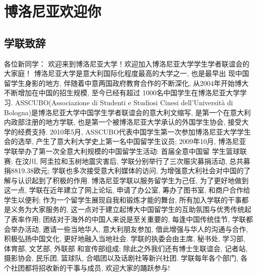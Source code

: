 
% 


\chapter{博洛尼亚欢迎你}                 %

\section{学联致辞}

各位新同学：
             欢迎来到博洛尼亚大学！欢迎加入博洛尼亚大学学生学者联谊会的大家庭！
          博洛尼亚大学是意大利国际化程度最高的大学之一, 也是最早出 现中国留学生身影的地方, 伴随着中意两国政府教育合作的不断深化, 从2004年开始博大不断增加在中国的招生规模, 至今已经有超过 1000名中国学生在博洛尼亚大学学习.
          ASSCUBO(Associazione di Studenti e Studiosi Cinesi dell’Università di Bologna)是博洛尼亚大学中国学生学者联谊会的意大利文缩写, 是第一个在意大利内政部注册的地方学联, 也是第一个被博洛尼亚大学承认的外国学生协会, 接受大学的经费支持. 2010年5月, ASSCUBO代表中国学生第一次参加博洛尼亚大学学生会的选举, 产生了意大利大学史上第一名中国留学生议员; 2009年10月, 博洛尼亚 学联举办了第一次全意大利规模的中国留学生活动: 首届全意中国留 学生篮球联赛; 在汶川, 阿圭拉和玉树地震灾害后, 学联分别举行了三次赈灾募捐活动, 总共募捐8819.38欧元; 学联也多次接受意大利媒体的访问, 为增强意大利社会对中国的了解与认识起到了积极的作用.
          博洛尼亚学联以服务留学生为己任, 为了更好地做到这一点, 学联在近年建立了网上论坛, 申请了办公室, 筹办了图书室, 和商户合作给学生以便利; 作为一个留学生展现自我和锻炼才能的舞台, 所有加入学联的干事都是义务为大家服务的, 这一点对于建立起博大中国留学生的互助氛围与优秀传统起了表率作用; 团结对于海外的中国人来说是至关重要的, 每逢中国传统佳节, 学联都会举办活动, 邀请一些当地华人, 意大利朋友参加, 借此增强与华人的沟通与合作, 积极弘扬中国文化, 更好地融入当地社会.
           学联的执委会由主席, 秘书处, 学习部, 体育部, 文艺部, 外联部 和宣传部组成; 除此之外我们还有博士生联谊会, 记者站, 摄影协会, 民乐团, 篮球队, 合唱团以及话剧社等新兴社团. 学联每年各个部门, 各个社团都将招收新的干事与成员, 欢迎大家的踊跃参与!



